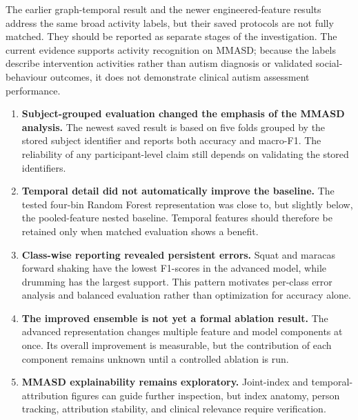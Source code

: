 \documentclass[a4paper,12pt]{report}
\begin{document}
The earlier graph-temporal result and the newer engineered-feature results address the same broad activity labels, but their saved protocols are not fully matched. They should be reported as separate stages of the investigation. The current evidence supports activity recognition on MMASD; because the labels describe intervention activities rather than autism diagnosis or validated social-behaviour outcomes, it does not demonstrate clinical autism assessment performance.

\begin{enumerate}
\item \textbf{Subject-grouped evaluation changed the emphasis of the MMASD analysis.} The newest saved result is based on five folds grouped by the stored subject identifier and reports both accuracy and macro-F1. The reliability of any participant-level claim still depends on validating the stored identifiers.

\item \textbf{Temporal detail did not automatically improve the baseline.} The tested four-bin Random Forest representation was close to, but slightly below, the pooled-feature nested baseline. Temporal features should therefore be retained only when matched evaluation shows a benefit.

\item \textbf{Class-wise reporting revealed persistent errors.} Squat and maracas forward shaking have the lowest F1-scores in the advanced model, while drumming has the largest support. This pattern motivates per-class error analysis and balanced evaluation rather than optimization for accuracy alone.

\item \textbf{The improved ensemble is not yet a formal ablation result.} The advanced representation changes multiple feature and model components at once. Its overall improvement is measurable, but the contribution of each component remains unknown until a controlled ablation is run.

\item \textbf{MMASD explainability remains exploratory.} Joint-index and temporal-attribution figures can guide further inspection, but index anatomy, person tracking, attribution stability, and clinical relevance require verification.
\end{enumerate}
\end{document}
